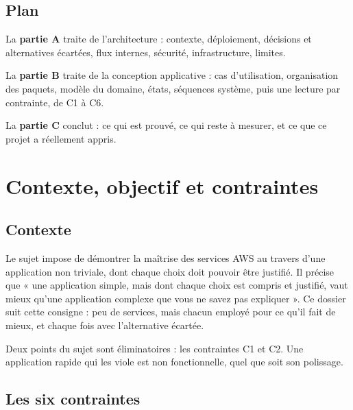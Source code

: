 \subsection{Plan}

La \textbf{partie A} traite de l'architecture : contexte, déploiement, décisions
et alternatives écartées, flux internes, sécurité, infrastructure, limites.

La \textbf{partie B} traite de la conception applicative : cas d'utilisation,
organisation des paquets, modèle du domaine, états, séquences système, puis une
lecture par contrainte, de C1 à C6.

La \textbf{partie C} conclut : ce qui est prouvé, ce qui reste à mesurer, et ce
que ce projet a réellement appris.

\section{Contexte, objectif et contraintes}

\subsection{Contexte}

Le sujet impose de démontrer la maîtrise des services AWS au travers d'une
application non triviale, dont chaque choix doit pouvoir être justifié. Il
précise que « une application simple, mais dont chaque choix est compris et
justifié, vaut mieux qu'une application complexe que vous ne savez pas
expliquer ». Ce dossier suit cette consigne : peu de services, mais chacun
employé pour ce qu'il fait de mieux, et chaque fois avec l'alternative écartée.

Deux points du sujet sont éliminatoires : les contraintes C1 et C2. Une
application rapide qui les viole est non fonctionnelle, quel que soit son
polissage.

\subsection{Les six contraintes}

